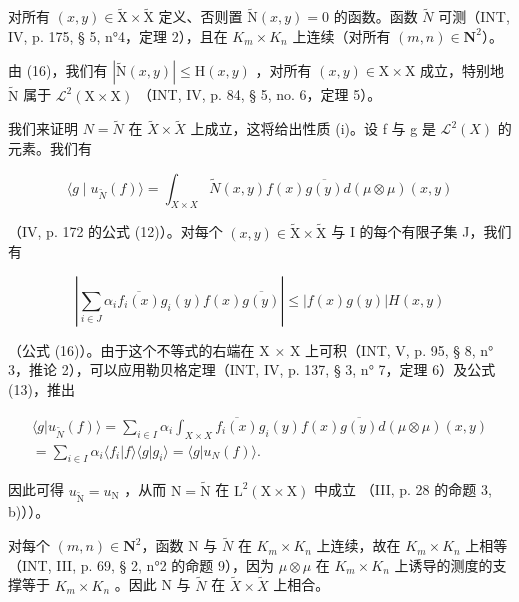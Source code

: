 对所有 \((x,y)\in\widetilde{\mathrm{X}}\times\widetilde{\mathrm{X}}\) 定义、否则置 \(\widetilde{\mathrm{N}}(x,y)=0\) 的函数。函数 \(\widetilde{N}\) 可测（INT, IV, p. 175, § 5, n°4，定理 2），且在 \(K_{m}\times K_{n}\) 上连续（对所有 \((m,n)\in\mathbf{N}^{2}\)）。

由 (16)，我们有 \(|\widetilde{\mathrm{N}}(x,y)| \leqslant \mathrm{H}(x,y)\) ，对所有 \((x,y) \in \mathrm{X} \times \mathrm{X}\) 成立，特别地 \(\widetilde{\mathrm{N}}\) 属于 \(\mathcal{L}^2(\mathrm{X} \times \mathrm{X})\) （INT, IV, p. 84, § 5, no. 6，定理 5）。

我们来证明 \(N = \widetilde{N}\) 在 \(\widetilde{X} \times \widetilde{X}\) 上成立，这将给出性质 (i)。设 f 与 g 是 \(\mathcal{L}^{2}(X)\) 的元素。我们有

\[
\langle g \mid u _ {\widetilde {N}} (f) \rangle = \int_ {X \times X} \widetilde {N} (x, y) f (x) \overline {{g (y)}} d (\mu \otimes \mu) (x, y)
\]

（IV, p. 172 的公式 (12)）。对每个 \((x,y)\in \widetilde{\mathrm{X}}\times \widetilde{\mathrm{X}}\) 与 I 的每个有限子集 J，我们有

\[
\left| \sum_ {i \in J} \alpha_ {i} \overline {{f _ {i} (x)}} g _ {i} (y) f (x) \overline {{g (y)}} \right| \leqslant | f (x) g (y) | H (x, y)
\]

（公式 (16)）。由于这个不等式的右端在 X × X 上可积（INT, V, p. 95, § 8, n° 3，推论 2），可以应用勒贝格定理（INT, IV, p. 137, § 3, n° 7，定理 6）及公式 (13)，推出

\[
\begin{array}{c} \langle g | u _ {\widetilde {N}} (f) \rangle = \sum_ {i \in I} \alpha_ {i} \int_ {X \times X} \overline {{f _ {i} (x)}} g _ {i} (y) f (x) \overline {{g (y)}} d (\mu \otimes \mu) (x, y) \\ = \sum_ {i \in I} \alpha_ {i} \langle f _ {i} | f \rangle \langle g | g _ {i} \rangle = \langle g | u _ {N} (f) \rangle . \end{array}
\]

因此可得 \(u_{\widetilde{\mathrm{N}}} = u_{\mathrm{N}}\) ，从而 \(\mathrm{N} = \widetilde{\mathrm{N}}\) 在 \(\mathrm{L}^2(\mathrm{X} \times \mathrm{X})\) 中成立 （III, p. 28 的命题 3, b)））。

对每个 \((m,n)\in\mathbf{N}^{2}\)，函数 N 与 \(\widetilde{N}\) 在 \(K_{m}\times K_{n}\) 上连续，故在 \(K_{m}\times K_{n}\) 上相等（INT, III, p. 69, § 2, n°2 的命题 9），因为 \(\mu\otimes\mu\) 在 \(K_{m}\times K_{n}\) 上诱导的测度的支撑等于 \(K_{m}\times K_{n}\) 。因此 N 与 \(\widetilde{N}\) 在 \(\widetilde{X}\times\widetilde{X}\) 上相合。

